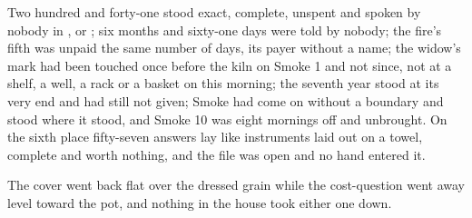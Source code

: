 Two hundred and forty-one stood exact, complete, unspent and spoken by nobody in ,  or ; six months and sixty-one days were told by nobody; the fire's fifth was unpaid the same number of days, its payer without a name; the widow's mark had been touched once before the kiln on Smoke 1 and not since, not at a shelf, a well, a rack or a basket on this morning; the seventh year stood at its very end and had still not given; Smoke had come on without a boundary and stood where it stood, and Smoke 10 was eight mornings off and unbrought. On the sixth place fifty-seven answers lay like instruments laid out on a towel, complete and worth nothing, and the file was open and no hand entered it.

The cover went back flat over the dressed grain while the cost-question went away level toward the pot, and nothing in the house took either one down.
